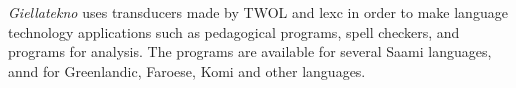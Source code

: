 \documentclass[a4paper,12pt]{article}
\begin{document}




\textit{Giellatekno} uses transducers made by TWOL and lexc in order to make language technology applications such as pedagogical programs, spell checkers, and programs for analysis. The programs are available for several Saami languages, annd for Greenlandic, Faroese, Komi and other languages.
\end{document}
